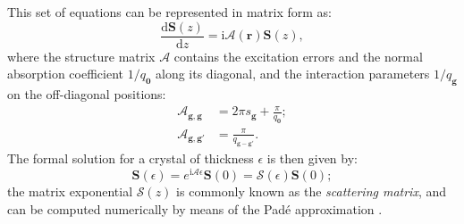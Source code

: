 \documentclass[DIV=calc, paper=letter, fontsize=11pt]{scrartcl}	 %
\begin{document}
This set of equations can be represented in matrix form as:
\begin{equation}
	\frac{\mathrm{d}\mathbf{S}(z)}{\mathrm{d}z} = \mathrm{i}\mathcal{A}(\mathbf{r})\mathbf{S}(z),\label{eq:matrix}
\end{equation}
where the structure matrix $\mathcal{A}$ contains the excitation errors and the normal absorption coefficient $1/q_{\mathbf{0}}$ 
along its diagonal, and the interaction parameters $1/q_{\mathbf{g}}$ on the off-diagonal positions:
\begin{align*}
    \mathcal{A}_{\mathbf{g},\mathbf{g}} & = 2\pi s_{\mathbf{g}} + \frac{\pi}{q_{\mathbf{0}}};\\
    \mathcal{A}_{\mathbf{g},\mathbf{g}'} & = \frac{\pi}{q_{\mathbf{g}-\mathbf{g}'}}.
\end{align*}
The formal solution for a crystal of thickness $\epsilon$ is then given by:
\begin{equation}
	\mathbf{S}(\epsilon) = e^{\mathrm{i}\mathcal{A}\epsilon}\mathbf{S}(0) = \mathcal{S}(\epsilon)\mathbf{S}(0);
\end{equation}
the matrix exponential $\mathcal{S}(z)$ is commonly known as the \textit{scattering matrix}, and can be computed numerically
by means of the Pad\'e approximation \cite{moler2003a}.
\end{document}
